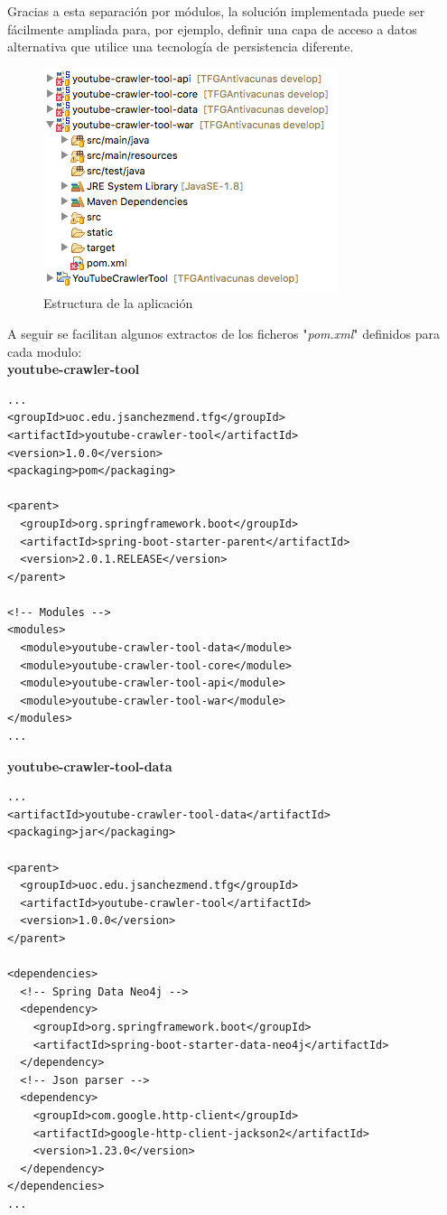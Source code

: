 \documentclass[11pt,a4paper]{article}
\begin{document}
Gracias a esta separación por módulos, la solución implementada puede ser fácilmente ampliada para, por ejemplo, definir una capa de acceso a datos alternativa que utilice una tecnología de persistencia diferente.

\begin{figure}[H]
\centering
\includegraphics[scale=0.60]{desarrollo/mvn.png}
\caption{Estructura de la aplicación}
\end{figure}

A seguir se facilitan algunos extractos de los ficheros "\textit{pom.xml}" definidos para cada modulo:
\\

\noindent\textbf{youtube-crawler-tool}
\begin{lstlisting}[style=C]
...
<groupId>uoc.edu.jsanchezmend.tfg</groupId>
<artifactId>youtube-crawler-tool</artifactId>
<version>1.0.0</version>
<packaging>pom</packaging>

<parent>
  <groupId>org.springframework.boot</groupId>
  <artifactId>spring-boot-starter-parent</artifactId>
  <version>2.0.1.RELEASE</version>
</parent>
	
<!-- Modules -->
<modules>
  <module>youtube-crawler-tool-data</module>
  <module>youtube-crawler-tool-core</module>
  <module>youtube-crawler-tool-api</module>
  <module>youtube-crawler-tool-war</module>
</modules>
...
\end{lstlisting}
\newpage  

\noindent\textbf{youtube-crawler-tool-data}
\begin{lstlisting}[style=C]
...
<artifactId>youtube-crawler-tool-data</artifactId>
<packaging>jar</packaging>

<parent>
  <groupId>uoc.edu.jsanchezmend.tfg</groupId>
  <artifactId>youtube-crawler-tool</artifactId>
  <version>1.0.0</version>
</parent>
    
<dependencies>
  <!-- Spring Data Neo4j -->
  <dependency>
    <groupId>org.springframework.boot</groupId>
    <artifactId>spring-boot-starter-data-neo4j</artifactId>
  </dependency>
  <!-- Json parser -->
  <dependency>
    <groupId>com.google.http-client</groupId>
    <artifactId>google-http-client-jackson2</artifactId>
    <version>1.23.0</version>
  </dependency>
</dependencies>
...
\end{lstlisting}
\medskip
\end{document}
